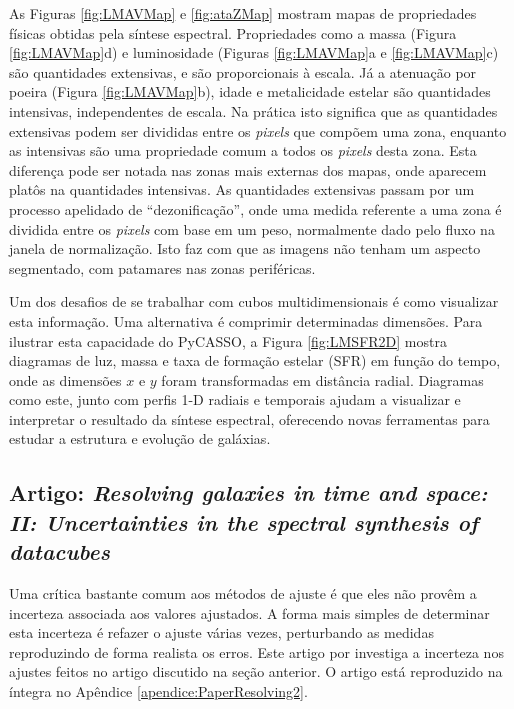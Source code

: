 As Figuras \ref{fig:LMAVMap} e \ref{fig:ataZMap} mostram mapas de propriedades
físicas obtidas pela síntese espectral. Propriedades como a massa (Figura
\ref{fig:LMAVMap}d) e luminosidade (Figuras \ref{fig:LMAVMap}a e
\ref{fig:LMAVMap}c) são quantidades extensivas, e são proporcionais à escala. Já
a atenuação por poeira (Figura \ref{fig:LMAVMap}b), idade e metalicidade estelar
são quantidades intensivas, independentes de escala. Na prática isto significa
que as quantidades extensivas podem ser divididas entre os {\em pixels} que
compõem uma zona, enquanto as intensivas são uma propriedade comum a todos os
{\em pixels} desta zona. Esta diferença pode ser notada nas zonas mais externas
dos mapas, onde aparecem platôs na quantidades intensivas. As quantidades
extensivas passam por um processo apelidado de ``dezonificação'', onde uma
medida referente a uma zona é dividida entre os {\em pixels} com base em um
peso, normalmente dado pelo fluxo na janela de normalização. Isto faz com que as
imagens não tenham um aspecto segmentado, com patamares nas zonas periféricas.

Um dos desafios de se trabalhar com cubos multidimensionais é como visualizar
esta informação. Uma alternativa é comprimir determinadas dimensões. Para
ilustrar esta capacidade do PyCASSO, a Figura \ref{fig:LMSFR2D} mostra diagramas
de luz, massa e taxa de formação estelar (SFR) em função do tempo, onde as
dimensões $x$ e $y$ foram transformadas em distância radial. Diagramas como
este, junto com perfis 1-D radiais e temporais ajudam a visualizar e interpretar
o resultado da síntese espectral, oferecendo novas ferramentas para estudar a
estrutura e evolução de galáxias.



\subsection{Artigo: {\em Resolving galaxies in time and space: II: Uncertainties
in the spectral synthesis of datacubes}}
\label{sec:pycasso:art:Resolving2}

Uma crítica bastante comum aos métodos de ajuste é que eles não provêm a
incerteza associada aos valores ajustados. A forma mais simples de determinar
esta incerteza é refazer o ajuste várias vezes, perturbando as medidas
reproduzindo de forma realista os erros. Este artigo por
\citet{CidFernandes2013} investiga a incerteza nos ajustes feitos no artigo
discutido na seção anterior. O artigo está reproduzido na íntegra no Apêndice
\ref{apendice:PaperResolving2}.

